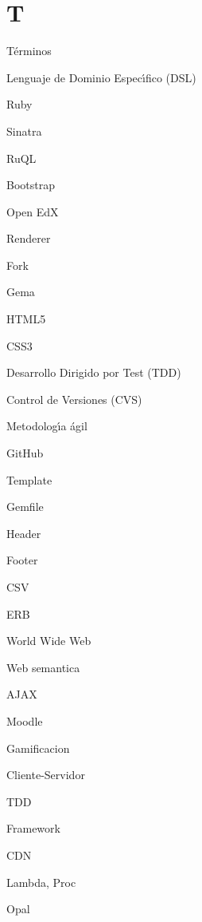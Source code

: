 \section{T}
\label{Apendice1:T}

T\'erminos
\bigskip

Lenguaje de Dominio Espec\'{\i}fico (DSL)
\bigskip

Ruby
\bigskip

Sinatra
\bigskip

RuQL
\bigskip

Bootstrap
\bigskip

Open EdX
\bigskip

Renderer
\bigskip

Fork
\bigskip

Gema
\bigskip

HTML5
\bigskip

CSS3
\bigskip

Desarrollo Dirigido por Test (TDD)
\bigskip

Control de Versiones (CVS)
\bigskip

Metodolog\'{\i}a \'agil
\bigskip

GitHub
\bigskip

Template
\bigskip

Gemfile
\bigskip

Header
\bigskip

Footer
\bigskip

CSV
\bigskip

ERB
\bigskip

World Wide Web
\bigskip

Web semantica
\bigskip

AJAX
\bigskip

Moodle
\bigskip

Gamificacion
\bigskip

Cliente-Servidor
\bigskip

TDD
\bigskip

Framework
\bigskip

CDN
\bigskip

Lambda, Proc
\bigskip

Opal
\bigskip